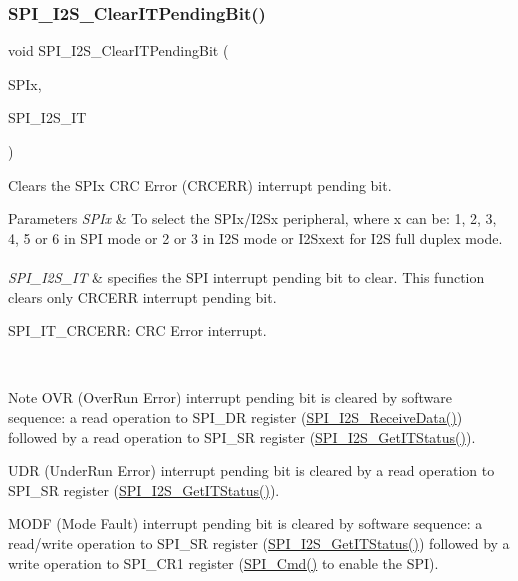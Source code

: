 \subsubsection{\texorpdfstring{S\+P\+I\+\_\+\+I2\+S\+\_\+\+Clear\+I\+T\+Pending\+Bit()}{SPI\_I2S\_ClearITPendingBit()}}
{\footnotesize\ttfamily void S\+P\+I\+\_\+\+I2\+S\+\_\+\+Clear\+I\+T\+Pending\+Bit (\begin{DoxyParamCaption}\item[{S\+P\+I\+\_\+\+Type\+Def $\ast$}]{S\+P\+Ix,  }\item[{uint8\+\_\+t}]{S\+P\+I\+\_\+\+I2\+S\+\_\+\+IT }\end{DoxyParamCaption})}



Clears the S\+P\+Ix C\+RC Error (C\+R\+C\+E\+RR) interrupt pending bit. 


\begin{DoxyParams}{Parameters}
{\em S\+P\+Ix} & To select the S\+P\+Ix/\+I2\+Sx peripheral, where x can be\+: 1, 2, 3, 4, 5 or 6 in S\+PI mode or 2 or 3 in I2S mode or I2\+Sxext for I2S full duplex mode. ~\newline
\\
\hline
{\em S\+P\+I\+\_\+\+I2\+S\+\_\+\+IT} & specifies the S\+PI interrupt pending bit to clear. This function clears only C\+R\+C\+E\+RR interrupt pending bit. ~\newline
 \begin{DoxyItemize}
\item S\+P\+I\+\_\+\+I\+T\+\_\+\+C\+R\+C\+E\+RR\+: C\+RC Error interrupt.\end{DoxyItemize}
\\
\hline
\end{DoxyParams}
\begin{DoxyNote}{Note}
O\+VR (Over\+Run Error) interrupt pending bit is cleared by software sequence\+: a read operation to S\+P\+I\+\_\+\+DR register (\mbox{\hyperlink{group___s_p_i___group2_gab77de76547f3bff403236b263b070a30}{S\+P\+I\+\_\+\+I2\+S\+\_\+\+Receive\+Data()}}) followed by a read operation to S\+P\+I\+\_\+\+SR register (\mbox{\hyperlink{group___s_p_i___group5_ga72decbc1cd79f8fad92a2204beca6bc5}{S\+P\+I\+\_\+\+I2\+S\+\_\+\+Get\+I\+T\+Status()}}). 

U\+DR (Under\+Run Error) interrupt pending bit is cleared by a read operation to S\+P\+I\+\_\+\+SR register (\mbox{\hyperlink{group___s_p_i___group5_ga72decbc1cd79f8fad92a2204beca6bc5}{S\+P\+I\+\_\+\+I2\+S\+\_\+\+Get\+I\+T\+Status()}}). ~\newline


M\+O\+DF (Mode Fault) interrupt pending bit is cleared by software sequence\+: a read/write operation to S\+P\+I\+\_\+\+SR register (\mbox{\hyperlink{group___s_p_i___group5_ga72decbc1cd79f8fad92a2204beca6bc5}{S\+P\+I\+\_\+\+I2\+S\+\_\+\+Get\+I\+T\+Status()}}) followed by a write operation to S\+P\+I\+\_\+\+C\+R1 register (\mbox{\hyperlink{group___s_p_i___group1_gaa31357879a65ee1ed7223f3b9114dcf3}{S\+P\+I\+\_\+\+Cmd()}} to enable the S\+PI). 
\end{DoxyNote}

